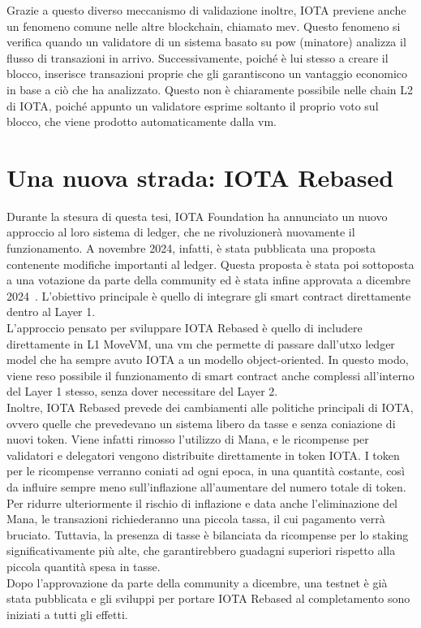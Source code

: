 \documentclass[12pt,a4paper,openright,twoside]{report}
\begin{document}
Grazie a questo diverso meccanismo di validazione inoltre, IOTA previene anche un fenomeno comune nelle altre blockchain, chiamato \acrfull{mev}. Questo fenomeno si verifica quando un validatore di un sistema basato su \acrlong{pow} (minatore) analizza il flusso di transazioni in arrivo. Successivamente, poiché è lui stesso a creare il blocco, inserisce transazioni proprie che gli garantiscono un vantaggio economico in base a ciò che ha analizzato. Questo non è chiaramente possibile nelle chain L2 di IOTA, poiché appunto un validatore esprime soltanto il proprio voto sul blocco, che viene prodotto automaticamente dalla \acrlong{vm}.

\section{Una nuova strada: IOTA Rebased}
Durante la stesura di questa tesi, IOTA Foundation ha annunciato un nuovo approccio al loro sistema di ledger, che ne rivoluzionerà nuovamente il funzionamento. A novembre 2024, infatti, è stata pubblicata una proposta contenente modifiche importanti al ledger. Questa proposta è stata poi sottoposta a una votazione da parte della community ed è stata infine approvata a dicembre 2024~\cite{iotarebasedtech}. L'obiettivo principale è quello di integrare gli smart contract direttamente dentro al Layer 1.\\ 
L'approccio pensato per sviluppare IOTA Rebased è quello di includere direttamente in L1 MoveVM, una \acrlong{vm} che permette di passare dall'\acrshort{utxo} ledger model che ha sempre avuto IOTA a un modello object-oriented. In questo modo, viene reso possibile il funzionamento di smart contract anche complessi all'interno del Layer 1 stesso, senza dover necessitare del Layer 2.\\
Inoltre, IOTA Rebased prevede dei cambiamenti alle politiche principali di IOTA, ovvero quelle che prevedevano un sistema libero da tasse e senza coniazione di nuovi token. Viene infatti rimosso l'utilizzo di Mana, e le ricompense per validatori e delegatori vengono distribuite direttamente in token IOTA. I token per le ricompense verranno coniati ad ogni epoca, in una quantità costante, così da influire sempre meno sull'inflazione all'aumentare del numero totale di token. Per ridurre ulteriormente il rischio di inflazione e data anche l'eliminazione del Mana, le transazioni richiederanno una piccola tassa, il cui pagamento verrà bruciato. Tuttavia, la presenza di tasse è bilanciata da ricompense per lo staking significativamente più alte, che garantirebbero guadagni superiori rispetto alla piccola quantità spesa in tasse.\\
Dopo l'approvazione da parte della community a dicembre, una testnet è già stata pubblicata e gli sviluppi per portare IOTA Rebased al completamento sono iniziati a tutti gli effetti.
\end{document}
